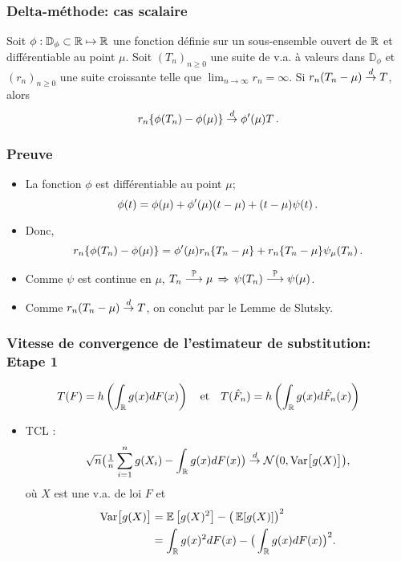 \begin{frame}
\frametitle{Delta-méthode: cas scalaire}
\begin{theo}
Soit $\phi : \mathbb{D}_\phi \subset \mathbb{R} \mapsto \mathbb{R}$ une fonction définie sur un sous-ensemble ouvert de $\mathbb{R}$ et différentiable au point $\mu$. Soit $(T_n)_{n \geq 0}$ une suite de v.a. à valeurs dans $\mathbb{D}_\phi$ et $(r_n)_{n \geq 0}$ une suite croissante telle que $\lim_{n \to \infty} r_n = \infty$. Si $r_n(T_n- \mu) \stackrel{d}{\rightarrow} T$, alors
$$
r_n \{ \phi(T_n) - \phi(\mu) \} \stackrel{d}{\rightarrow} \phi'(\mu) T \,.
$$
\end{theo}
\end{frame}

\begin{frame}
\frametitle{Preuve}
\begin{itemize}
\item La fonction $\phi$ est différentiable au point $\mu$;
\[
\phi(t)= \phi(\mu) + \phi'(\mu) (t-\mu) + (t-\mu) \psi(t) \,.
\]
\pause \item Donc,
\[
r_n \{ \phi(T_n) - \phi(\mu) \} = \phi'(\mu) r_n \{ T_n - \mu \} + r_n \{ T_n - \mu \} \psi_\mu(T_n) \,.
\]
\pause \item Comme $\psi$ est continue en $\mu$, $T_n \stackrel{\operatorname{{\mathbb P}}}{\longrightarrow} \mu \, \Rightarrow \, \psi(T_n) \stackrel{\operatorname{{\mathbb P}}}{\longrightarrow} \psi(\mu)$.
\pause \item Comme $r_n( T_n - \mu) \stackrel{d}{\rightarrow} T$, on conclut par le Lemme de Slutsky.
\end{itemize}
\end{frame}

\begin{frame}
\frametitle{Vitesse de convergence de l'estimateur de substitution: Etape 1}
\[
T(F)= h \left( \int_{\mathbb{R}} g(x) dF(x) \right) \quad \text{et} \quad T(\hat{F}_n)= h \left( \int_{\mathbb{R}} g(x) d \hat{F}_n(x) \right)
\]
\begin{itemize}
\item \alert{TCL} :
$$\sqrt{n}\big(\tfrac{1}{n}\sum_{i=1}^ng(X_i)-\int_{\operatorname{{\mathbb R}}}g(x)dF(x)\big) \stackrel{d}{\rightarrow} {\mathcal N}\big(0,\mathrm{Var}\big[g(X)\big]\big),$$
où $X$ est une v.a. de loi $F$ et
\begin{align*}
\text{Var}\big[g(X)\big] &= \operatorname{{\mathbb E}}\big[g(X)^2\big]-\big(\operatorname{{\mathbb E}}[g(X)]\big)^2 \\
&= \int_{\operatorname{{\mathbb R}}}g(x)^2dF(x)-\big(\int_{\operatorname{{\mathbb R}}}g(x)dF(x)\big)^2.
\end{align*}
\end{itemize}
\end{frame}

